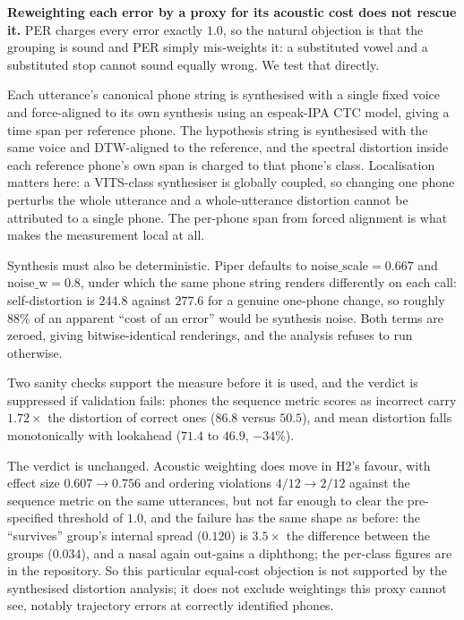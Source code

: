 \documentclass[journal]{IEEEtran}
\begin{document}
\textbf{Reweighting each error by a proxy for its acoustic cost does not rescue
it.} PER charges every error exactly $1.0$, so the natural objection is that
the grouping is sound and PER simply mis-weights it: a substituted vowel and a
substituted stop cannot sound equally wrong. We test that directly.

Each utterance's canonical phone string is synthesised with a single fixed
voice and force-aligned to its own synthesis using an espeak-IPA CTC model,
giving a time span per reference phone. The hypothesis string is synthesised
with the same voice and DTW-aligned to the reference, and the spectral
distortion inside each reference phone's own span is charged to that phone's
class. Localisation matters here: a VITS-class synthesiser is globally coupled,
so changing one phone perturbs the whole utterance and a whole-utterance
distortion cannot be attributed to a single phone. The per-phone span from
forced alignment is what makes the measurement local at all.

Synthesis must also be deterministic. Piper defaults to
$\mathrm{noise\_scale}=0.667$ and $\mathrm{noise\_w}=0.8$, under which the same
phone string renders differently on each call: self-distortion is $244.8$
against $277.6$ for a genuine one-phone change, so roughly 88\% of an apparent
``cost of an error'' would be synthesis noise. Both terms are zeroed, giving
bitwise-identical renderings, and the analysis refuses to run otherwise.

Two sanity checks support the measure before it is used, and the verdict is suppressed if
validation fails: phones the sequence metric scores as incorrect carry
$1.72\times$ the distortion of correct ones ($86.8$ versus $50.5$), and mean
distortion falls monotonically with lookahead ($71.4$ to $46.9$, $-34\%$).

The verdict is unchanged. Acoustic weighting does move
in H2's favour, with effect size $0.607 \rightarrow 0.756$ and ordering
violations $4/12 \rightarrow 2/12$ against the sequence metric on the same
utterances, but not far enough to clear the pre-specified threshold of $1.0$, and the
failure has the same shape as before: the ``survives'' group's internal spread
($0.120$) is $3.5\times$ the difference between the groups ($0.034$), and a
nasal again out-gains a diphthong; the per-class figures are in the
repository. So this particular equal-cost objection is not supported by the synthesised
distortion analysis; it does not exclude weightings this proxy cannot see,
notably trajectory errors at correctly identified phones.
\end{document}
